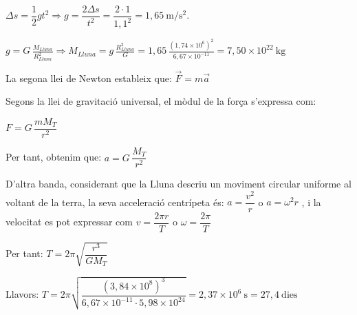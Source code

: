 \begin{solapartat}
 $\Delta s = \dfrac{1}{2}gt^2 \Longrightarrow g = \dfrac{2\Delta s}{t^2} = \dfrac{2\cdot 1}{1,1^2} = 1,65\ \mathrm{m/s^2}$.


$\displaystyle g = G\,\frac{M_{Lluna}}{R_{Lluna}^2} \Rightarrow M_{Lluna} = g\,\frac{R_{Lluna}^2}{G} = 1,65\,\frac{(1,74\times 10^{6})^2}{6,67\times 10^{-11}} = 7,50\times 10^{22}\ \mathrm{kg}$ \quad {}
\end{solapartat}

\begin{solapartat}
La segona llei de Newton estableix que: $\vec{F} = m\vec{a}$ \quad {}

Segons la llei de gravitació universal, el mòdul de la força s'expressa com:

$F = G\,\dfrac{mM_T}{r^2}$ \quad {}

Per tant, obtenim que: $a = G\,\dfrac{M_T}{r^2}$ \quad {}

D'altra banda, considerant que la Lluna descriu un moviment circular uniforme al voltant de la terra, la seva acceleració centrípeta és: $a = \dfrac{v^2}{r}$ o $a = \omega^2 r$ \unskip, i la velocitat es pot expressar com $v = \dfrac{2\pi r}{T}$ o $\omega = \dfrac{2\pi}{T}$ \quad {}

Per tant: $T = 2\pi\sqrt{\dfrac{r^3}{GM_T}}$ \quad {}

Llavors: $T = 2\pi\sqrt{\dfrac{(3,84\times 10^{8})^3}{6,67\times 10^{-11}\cdot 5,98\times 10^{24}}} = 2,37\times 10^{6}\ \mathrm{s} = 27,4\ \mathrm{dies}$ \quad {}
\end{solapartat}
